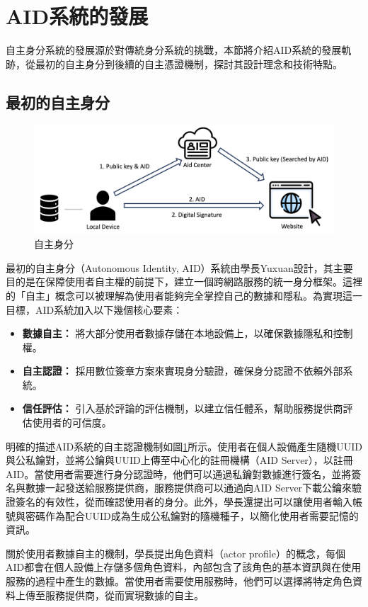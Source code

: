 \section{AID系統的發展}
自主身分系統的發展源於對傳統身分系統的挑戰，本節將介紹AID系統的發展軌跡，從最初的自主身分到後續的自主憑證機制，探討其設計理念和技術特點。
\subsection{最初的自主身分}
\begin{figure}
  \centering
  \includegraphics[width=\linewidth,keepaspectratio]{figures/old-aid.png}
  \caption{自主身分}
  \label{fig:old-aid}
\end{figure}
最初的自主身分（Autonomous Identity, AID）系統由學長Yuxuan\cite{ntu-lin2014autonomous}設計，其主要目的是在保障使用者自主權的前提下，建立一個跨網路服務的統一身分框架。這裡的「自主」概念可以被理解為使用者能夠完全掌控自己的數據和隱私。為實現這一目標，AID系統加入以下幾個核心要素：
\begin{itemize}
  \item \textbf{數據自主：} 將大部分使用者數據存儲在本地設備上，以確保數據隱私和控制權。
  \item \textbf{自主認證：} 採用數位簽章方案來實現身分驗證，確保身分認證不依賴外部系統。
  \item \textbf{信任評估：} 引入基於評論的評估機制，以建立信任體系，幫助服務提供商評估使用者的可信度。
\end{itemize}

明確的描述AID系統的自主認證機制如圖\ref{fig:old-aid}所示。使用者在個人設備產生隨機UUID與公私鑰對，並將公鑰與UUID上傳至中心化的註冊機構（AID Server），以註冊AID。當使用者需要進行身分認證時，他們可以通過私鑰對數據進行簽名，並將簽名與數據一起發送給服務提供商，服務提供商可以通過向AID Server下載公鑰來驗證簽名的有效性，從而確認使用者的身分。此外，學長還提出可以讓使用者輸入帳號與密碼作為配合UUID成為生成公私鑰對的隨機種子，以簡化使用者需要記憶的資訊。

關於使用者數據自主的機制，學長提出角色資料（actor profile）的概念，每個AID都會在個人設備上存儲多個角色資料，內部包含了該角色的基本資訊與在使用服務的過程中產生的數據。當使用者需要使用服務時，他們可以選擇將特定角色資料上傳至服務提供商，從而實現數據的自主。

